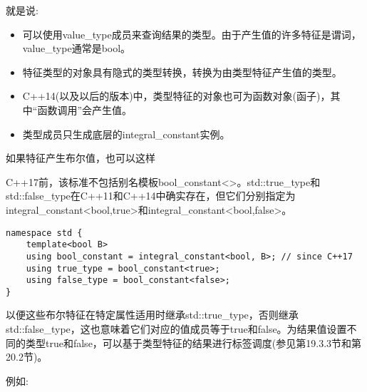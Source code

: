 就是说:

\begin{itemize}
\item 
可以使用value\_type成员来查询结果的类型。由于产生值的许多特征是谓词，value\_type通常是bool。

\item 
特征类型的对象具有隐式的类型转换，转换为由类型特征产生值的类型。

\item 
C++14(以及以后的版本)中，类型特征的对象也可为函数对象(函子)，其中“函数调用”会产生值。

\item 
类型成员只生成底层的integral\_constant实例。
\end{itemize}

如果特征产生布尔值，也可以这样

\begin{tcolorbox}[colback=webgreen!5!white,colframe=webgreen!75!black]
\hspace*{0.75cm}C++17前，该标准不包括别名模板bool\_constant<>。std::true\_type和std::false\_type在C++11和C++14中确实存在，但它们分别指定为integral\_constant<bool,true>和integral\_constant<bool,false>。
\end{tcolorbox}

\begin{lstlisting}[style=styleCXX]
namespace std {
	template<bool B>
	using bool_constant = integral_constant<bool, B>; // since C++17
	using true_type = bool_constant<true>;
	using false_type = bool_constant<false>;
}
\end{lstlisting}

以便这些布尔特征在特定属性适用时继承std::true\_type，否则继承std::false\_type，这也意味着它们对应的值成员等于true和false。为结果值设置不同的类型true和false，可以基于类型特征的结果进行标签调度(参见第19.3.3节和第20.2节)。

例如:

